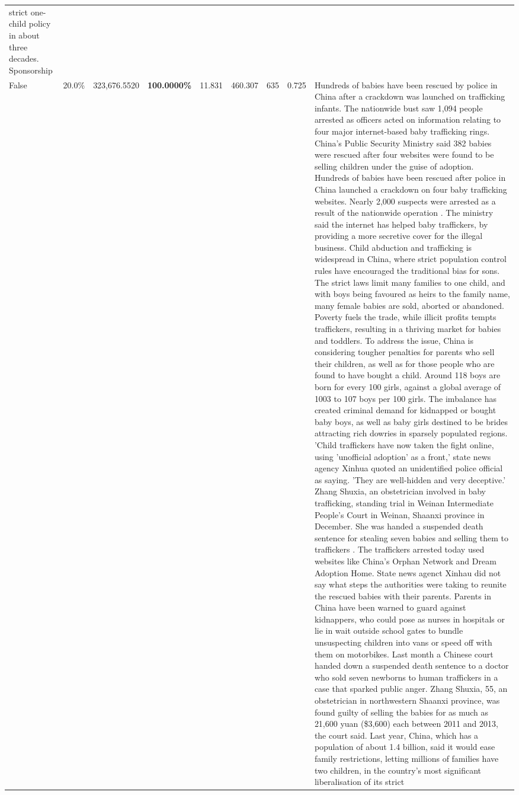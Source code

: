 \begin{table}[H]
\begin{tabular}{lllrlllll}
strict one-child policy in about three decades. Sponsorship \\
\cline{1-9}
False & 20.0\% & 323,676.5520 & \bfseries \color{red} 100.0000\% & 11.831 & 460.307 & 635 & 0.725 & Hundreds of babies have been rescued by police in China after a crackdown was launched on trafficking infants. The nationwide bust saw 1,094 people arrested as officers acted on information relating to four major internet-based baby trafficking rings. China's Public Security Ministry said 382 babies were rescued after four websites were found to be selling children under the guise of adoption. Hundreds of babies have been rescued after police in China launched a crackdown on four baby trafficking websites. Nearly 2,000 suspects were arrested as a result of the nationwide operation . The ministry said the internet has helped baby traffickers, by providing a more secretive cover for the illegal business. Child abduction and trafficking is widespread in China, where strict population control rules have encouraged the traditional bias for sons. The strict laws limit many families to one child, and with boys being favoured as heirs to the family name, many female babies are sold, aborted or abandoned. Poverty fuels the trade, while illicit profits tempts traffickers, resulting in a thriving market for babies and toddlers. To address the issue, China is considering tougher penalties for parents who sell their children, as well as for those people who are found to have bought a child. Around 118 boys are born for every 100 girls, against a global average of 1003 to 107 boys per 100 girls. The imbalance has created criminal demand for kidnapped or bought baby boys, as well as baby girls destined to be brides attracting rich dowries in sparsely populated regions. 'Child traffickers have now taken the fight online, using 'unofficial adoption' as a front,' state news agency Xinhua quoted an unidentified police official as saying. 'They are well-hidden and very deceptive.' Zhang Shuxia, an obstetrician involved in baby trafficking, standing trial in Weinan Intermediate People's Court in Weinan, Shaanxi province in December. She was handed a suspended death sentence for stealing seven babies and selling them to traffickers . The traffickers arrested today used websites like China's Orphan Network and Dream Adoption Home. State news agenct Xinhau did not say what steps the authorities were taking to reunite the rescued babies with their parents. Parents in China have been warned to guard against kidnappers, who could pose as nurses in hospitals or lie in wait outside school gates to bundle unsuspecting children into vans or speed off with them on motorbikes. Last month a Chinese court handed down a suspended death sentence to a doctor who sold seven newborns to human traffickers in a case that sparked public anger. Zhang Shuxia, 55, an obstetrician in northwestern Shaanxi province, was found guilty of selling the babies for as much as 21,600 yuan (\$3,600) each between 2011 and 2013, the court said. Last year, China, which has a population of about 1.4 billion, said it would ease family restrictions, letting millions of families have two children, in the country's most significant liberalisation of its strict 
\end{tabular}
\end{table}
